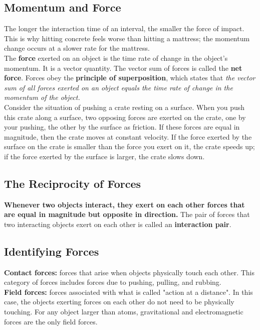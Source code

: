     \subsection{Momentum and Force}

        The longer the interaction time of an interval, the smaller the force of impact. This is why hitting concrete feels worse than hitting a mattress; the momentum change occurs at a slower rate for the mattress. \\

        The \textbf{force} exerted on an object is the time rate of change in the object's momentum. It is a vector quantity. The vector sum of forces is called the \textbf{net force}. Forces obey the
        \textbf{principle of superposition}, which states that \textit{the vector sum of all forces exerted on an object equals the time rate of change in the momentum of the object.} \\

        Consider the situation of pushing a crate resting on a surface. When you push this crate along a surface, two opposing forces are exerted on the crate, one by your pushing, the other by the surface as friction.
        If these forces are equal in magnitude, then the crate moves at constant velocity. If the force exerted by the surface on the crate is smaller than the force you exert on it, the crate speeds up; if the force
        exerted by the surface is larger, the crate slows down.



    \subsection{The Reciprocity of Forces}

        \textbf{Whenever two objects interact, they exert on each other forces that are equal in magnitude but opposite in direction.} The pair of forces that two interacting objects exert on each other is called an
        \textbf{interaction pair}.


    \subsection{Identifying Forces}

        \textbf{Contact forces:} forces that arise when objects physically touch each other. This category of forces includes forces due to pushing, pulling, and rubbing. \\
        \textbf{Field forces:} forces associated with what is called "action at a distance". In this case, the objects exerting forces on each other do not need to be physically touching. For any object larger than atoms,
        gravitational and electromagnetic forces are the only field forces.


